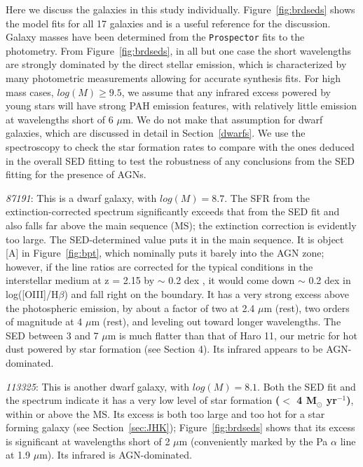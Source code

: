 \documentclass[twocolumn]{aastex63}
\begin{document}
Here we discuss the galaxies in this study individually. Figure~\ref{fig:brdseds} shows the model fits for all 17 galaxies and is a useful reference for the discussion. Galaxy masses have been determined from the \texttt{Prospector} fits to the photometry. From Figure~\ref{fig:brdseds}, in all but one case the short wavelengths are strongly dominated by the direct stellar emission, which is characterized by many photometric measurements  allowing for accurate synthesis fits. For high mass cases, $log(M) \ge 9.5$, we assume that any infrared excess powered by young stars will have strong PAH emission features, with relatively little emission at wavelengths  short of 6 $\mu$m. We do not make that assumption for dwarf galaxies, which are discussed in detail in Section~\ref{dwarfs}. We use the spectroscopy to check the star formation rates to compare with the ones deduced in the overall SED fitting to test the robustness of any conclusions from the SED fitting for the presence of AGNs. 

{\it 87191}: This is a dwarf galaxy, with $log(M) = 8.7$.  The SFR from the extinction-corrected spectrum  significantly  exceeds that from the SED fit and also falls far above the main sequence (MS); the extinction correction is evidently too large. The SED-determined value puts it in the main sequence. It is object 
[A] in Figure~\ref{fig:bpt}, which nominally puts it barely into the AGN zone; however, if the line ratios are corrected for the typical conditions in the interstellar medium at z = 2.15 by $\sim$ 0.2 dex \citep[][see also \citet{Ubler2023}]{Backhaus2024}, it would come down $\sim$ 0.2 dex in log([OIII]/H$\beta$) and fall right on the boundary. It has a very strong excess above the photospheric emission, by about a factor of two at 2.4 $\mu$m (rest), two orders of magnitude  at 4 $\mu$m (rest), and leveling out toward longer wavelengths. The SED between 3 and 7 $\mu$m is much flatter than that of Haro 11, our metric for hot dust powered by star formation (see Section 4). 
  Its infrared appears to be  
AGN-dominated.

{\it 113325}: This is another dwarf galaxy, with $log(M) = 8.1$. Both the SED fit and the spectrum indicate it has a very low level of star formation {\bf ($<$ 4 M$_\odot$ yr$^{-1}$)}, within or above the MS. Its excess is both too large and too hot for a star forming galaxy (see Section~\ref{sec:JHK}); Figure~\ref{fig:brdseds} shows that its excess is significant at wavelengths short of 2 $\mu$m (conveniently marked by the Pa $\alpha$ line at 1.9 $\mu$m).  Its infrared is 
AGN-dominated. 
\end{document}
